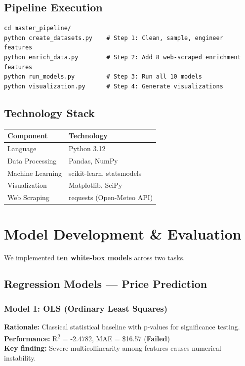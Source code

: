 \documentclass[12pt,a4paper]{article}
\begin{document}
\subsection{Pipeline Execution}

\begin{verbatim}
cd master_pipeline/
python create_datasets.py    # Step 1: Clean, sample, engineer features
python enrich_data.py        # Step 2: Add 8 web-scraped enrichment features
python run_models.py         # Step 3: Run all 10 models
python visualization.py      # Step 4: Generate visualizations
\end{verbatim}

\subsection{Technology Stack}

\begin{table}[H]
\centering
\begin{tabular}{ll}
\toprule
\textbf{Component} & \textbf{Technology} \\
\midrule
Language & Python 3.12 \\
Data Processing & Pandas, NumPy \\
Machine Learning & scikit-learn, statsmodels \\
Visualization & Matplotlib, SciPy \\
Web Scraping & requests (Open-Meteo API) \\
\bottomrule
\end{tabular}
\end{table}

\newpage

\section{Model Development \& Evaluation}

We implemented \textbf{ten white-box models} across two tasks.

\subsection{Regression Models --- Price Prediction}

\subsubsection*{Model 1: OLS (Ordinary Least Squares)}
\textbf{Rationale:} Classical statistical baseline with p-values for significance testing.\\
\textbf{Performance:} R\textsuperscript{2} = -2.4782, MAE = \$16.57 (\textbf{Failed})\\
\textbf{Key finding:} Severe multicollinearity among features causes numerical instability.
\end{document}
